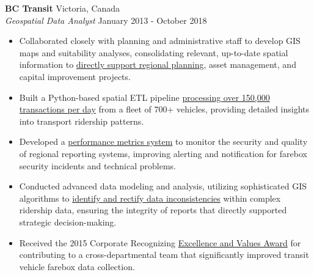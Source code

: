 \documentclass[letterpaper]{article}
\newcommand{\employer}[4]{
        \vspace{3pt}
        \textbf{#1}  %
        \hfill #2\\  %
        \textit{#3}  %
        \hfill #4\\  %
        \vspace{3mm}
    }
\newenvironment{jobtasklist}
        {
            \vspace{-12pt}
            \begin{itemize} \itemsep 0pt
        }{
            \end{itemize}
            \vspace{-3pt}
        }
\newcommand{\impt}[1]{\uline{#1}}
\begin{document}
\employer
    {BC Transit}
    {Victoria, Canada}
    {Geospatial Data Analyst}
    {January 2013 - October 2018}

\begin{jobtasklist}
    \item Collaborated closely with planning and administrative staff to develop GIS maps and suitability analyses,
        consolidating relevant, up-to-date spatial information to \impt{directly support regional planning}, asset
            management, and capital improvement projects.
    \item Built a Python-based spatial ETL pipeline
            \impt{processing over 150,000 transactions per day}
            from a fleet of 700+ vehicles, providing detailed insights into transport ridership patterns.
    \item Developed a \impt{performance metrics system} to monitor the security and
            quality of regional reporting systems, improving alerting and
            notification for farebox security incidents and technical problems.
    \item Conducted advanced data modeling and analysis, utilizing sophisticated GIS algorithms
            to \impt{identify and rectify data inconsistencies} within complex ridership data,
            ensuring the integrity of reports that directly supported strategic decision-making.
    \item Received the 2015 Corporate Recognizing \impt{Excellence and Values Award}
            for contributing to a cross-departmental team that significantly
            improved transit vehicle farebox data collection.
\end{jobtasklist}
\end{document}
